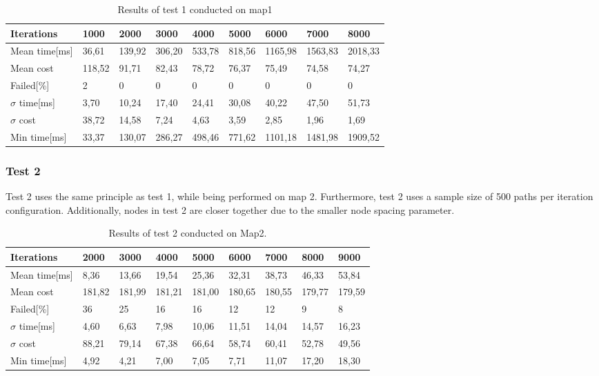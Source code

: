 \begin{table}[!ht]
	\centering
	\renewcommand{\arraystretch}{1.2}
	\begin{tabular}{|l||l|l|l|l|l|l|l|l|}
		\hline
		Iterations & 1000 & 2000 & 3000 & 4000 & 5000 & 6000 & 7000 & 8000 \\ \hline\hline
		Mean time[ms] & 36,61  & 139,92  & 306,20  & 533,78  & 818,56  & 1165,98  & 1563,83  & 2018,33  \\ \hline
		Mean cost & 118,52  & 91,71  & 82,43  & 78,72  & 76,37  & 75,49  & 74,58  & 74,27  \\ \hline
		Failed[\%] & 2  & 0  & 0  & 0  & 0  & 0  & 0  & 0  \\ \hline
		$\sigma$ time[ms] & 3,70  & 10,24  & 17,40  & 24,41  & 30,08  & 40,22  & 47,50  & 51,73  \\ \hline
		$\sigma$ cost & 38,72  & 14,58  & 7,24  & 4,63  & 3,59  & 2,85  & 1,96  & 1,69  \\ \hline
		Min time[ms] & 33,37  & 130,07  & 286,27  & 498,46  & 771,62  & 1101,18  & 1481,98  & 1909,52  \\ \hline
	\end{tabular}
	\label{tab:pp_precision1}
	\caption{Results of test 1 conducted on map1}
\end{table}

\subsubsection{Test 2}
\label{sec:test2}
Test 2 uses the same principle as test 1, while being performed on map 2. Furthermore, test 2 uses a sample size of 500 paths per iteration configuration. Additionally, nodes in test 2 are closer together due to the smaller node spacing parameter. 

\begin{table}[!ht]
	\centering
	\renewcommand{\arraystretch}{1.2}
	\begin{tabular}{|l||l|l|l|l|l|l|l|l|}
		\hline
		Iterations & 2000 & 3000 & 4000 & 5000 & 6000 & 7000 & 8000 & 9000 \\ \hline\hline
		Mean time[ms] & 8,36  & 13,66  & 19,54  & 25,36  & 32,31  & 38,73  & 46,33  & 53,84  \\ \hline
		Mean cost & 181,82  & 181,99  & 181,21  & 181,00  & 180,65  & 180,55  & 179,77  & 179,59  \\ \hline
		Failed[\%] & 36  & 25  & 16  & 16  & 12  & 12  & 9  & 8  \\ \hline
		$\sigma$ time[ms] & 4,60  & 6,63  & 7,98  & 10,06  & 11,51  & 14,04  & 14,57  & 16,23  \\ \hline
		$\sigma$ cost & 88,21  & 79,14  & 67,38  & 66,64  & 58,74  & 60,41  & 52,78  & 49,56  \\ \hline
		Min time[ms] & 4,92  & 4,21  & 7,00  & 7,05  & 7,71  & 11,07  & 17,20  & 18,30  \\ \hline
	\end{tabular}
	\label{tab:pp_precision2}
	\caption{Results of test 2 conducted on Map2.}
\end{table}

